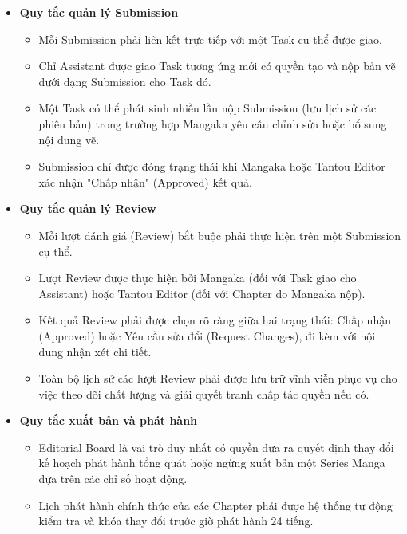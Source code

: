 \begin{itemize}
\begin{itemize}
        \item Mỗi Task bắt buộc phải có thời hạn hoàn thành (Deadline) cụ thể, trạng thái xử lý (\texttt{pending}, \texttt{in\_progress}, \texttt{completed}) và mô tả chi tiết công việc.
        \item Chỉ người tạo Task (Mangaka) mới có quyền chỉnh sửa thông tin, thay đổi trạng thái trực tiếp hoặc hủy bỏ Task.
    \end{itemize}
    \item \textbf{Quy tắc quản lý Submission}
    \begin{itemize}
        \item Mỗi Submission phải liên kết trực tiếp với một Task cụ thể được giao.
        \item Chỉ Assistant được giao Task tương ứng mới có quyền tạo và nộp bản vẽ dưới dạng Submission cho Task đó.
        \item Một Task có thể phát sinh nhiều lần nộp Submission (lưu lịch sử các phiên bản) trong trường hợp Mangaka yêu cầu chỉnh sửa hoặc bổ sung nội dung vẽ.
        \item Submission chỉ được đóng trạng thái khi Mangaka hoặc Tantou Editor xác nhận "Chấp nhận" (Approved) kết quả.
    \end{itemize}
    \item \textbf{Quy tắc quản lý Review}
    \begin{itemize}
        \item Mỗi lượt đánh giá (Review) bắt buộc phải thực hiện trên một Submission cụ thể.
        \item Lượt Review được thực hiện bởi Mangaka (đối với Task giao cho Assistant) hoặc Tantou Editor (đối với Chapter do Mangaka nộp).
        \item Kết quả Review phải được chọn rõ ràng giữa hai trạng thái: Chấp nhận (Approved) hoặc Yêu cầu sửa đổi (Request Changes), đi kèm với nội dung nhận xét chi tiết.
        \item Toàn bộ lịch sử các lượt Review phải được lưu trữ vĩnh viễn phục vụ cho việc theo dõi chất lượng và giải quyết tranh chấp tác quyền nếu có.
    \end{itemize}
    \item \textbf{Quy tắc xuất bản và phát hành}
    \begin{itemize}
        \item Editorial Board là vai trò duy nhất có quyền đưa ra quyết định thay đổi kế hoạch phát hành tổng quát hoặc ngừng xuất bản một Series Manga dựa trên các chỉ số hoạt động.
        \item Lịch phát hành chính thức của các Chapter phải được hệ thống tự động kiểm tra và khóa thay đổi trước giờ phát hành 24 tiếng.

\end{itemize}
\end{itemize}
